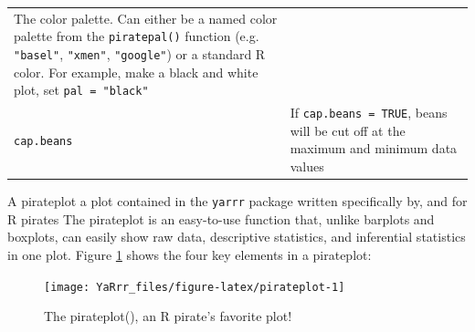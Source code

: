 \documentclass[]{book}
\theoremstyle{definition}
\theoremstyle{definition}
\theoremstyle{remark}
\begin{document}
\begin{longtable}[]{@{}ll@{}}
\begin{minipage}[t]{0.67\columnwidth}
The color palette. Can either be a named color palette from the
\texttt{piratepal()} function (e.g. \texttt{"basel"}, \texttt{"xmen"},
\texttt{"google"}) or a standard R color. For example, make a black and
white plot, set \texttt{pal\ =\ "black"}\strut
\end{minipage}\tabularnewline
\begin{minipage}[t]{0.18\columnwidth}\raggedright\strut
\texttt{cap.beans}\strut
\end{minipage} & \begin{minipage}[t]{0.67\columnwidth}\raggedright\strut
If \texttt{cap.beans\ =\ TRUE}, beans will be cut off at the maximum and
minimum data values\strut
\end{minipage}\tabularnewline
\bottomrule
\end{longtable}

A pirateplot a plot contained in the \texttt{yarrr} package written
specifically by, and for R pirates The pirateplot is an easy-to-use
function that, unlike barplots and boxplots, can easily show raw data,
descriptive statistics, and inferential statistics in one plot. Figure
\ref{fig:pirateplot} shows the four key elements in a pirateplot:

\begin{figure}

{\centering \texttt{[image: YaRrr\_files/figure-latex/pirateplot-1]} 

}

\caption{The pirateplot(), an R pirate's favorite plot!}\label{fig:pirateplot}
\end{figure}
\end{document}
